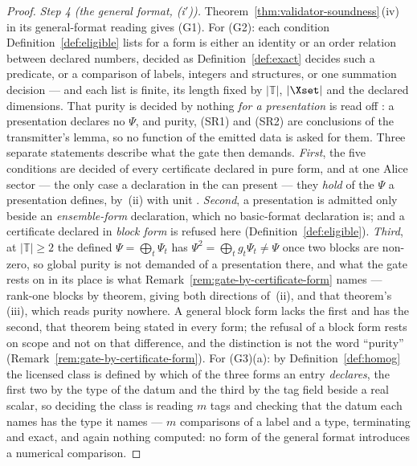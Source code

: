 \begin{proof}
\emph{Step 4 (the general format, (i$'$)).} Theorem~\ref{thm:validator-soundness}\,(iv) in its
general-format reading gives (G1). For (G2): each condition
Definition~\ref{def:eligible} lists for a form is either an identity or an
order relation between declared numbers, decided as
Definition~\ref{def:exact} decides such a predicate, or a comparison of labels,
integers and structures, or one summation decision --- and each list is finite,
its length fixed by $|\mathbb{T}|$, $|\Xset|$ and the declared dimensions. That
purity is decided by nothing \emph{for a presentation} is read off
: a presentation declares no $\Psi$, and purity,
(SR1) and (SR2) are conclusions of the transmitter's lemma, so no function of
the emitted data is asked for them. Three separate statements describe what
the gate then demands. \emph{First}, the five conditions are decided of every
certificate declared in pure form, and at one Alice sector --- the only case a
declaration in the  can present --- they \emph{hold} of the
$\Psi$ a presentation defines, by
\,(ii) with unit .
\emph{Second}, a presentation is admitted only beside an
\emph{ensemble-form} declaration, which no basic-format declaration is; and a
certificate declared in \emph{block form} is refused here
(Definition~\ref{def:eligible}). \emph{Third}, at $|\mathbb{T}|\ge2$ the
defined $\Psi=\bigoplus_t\Psi_t$ has $\Psi^2=\bigoplus_tg_t\Psi_t\ne\Psi$ once
two blocks are non-zero, so global purity is not demanded of a presentation
there, and what the gate rests on in its place is what
Remark~\ref{rem:gate-by-certificate-form} names --- rank-one blocks by theorem,
giving both directions of \,(ii),
and that theorem's (iii), which reads purity nowhere. A general block form
lacks the first and has the second, that theorem being stated in every form;
the refusal of a block form rests on scope and not on that difference, and
the distinction is not the word ``purity''
(Remark~\ref{rem:gate-by-certificate-form}). For (G3)(a): by
Definition~\ref{def:homog} the licensed class is defined by which of the three
forms an entry \emph{declares}, the first two by the type of the datum and the
third by the tag field beside a real scalar, so deciding the class is reading
$m$ tags and checking that the datum each names has the type it names --- $m$
comparisons of a label and a type, terminating and exact, and again nothing
computed: no form of the general format introduces a numerical comparison.


\end{proof}
